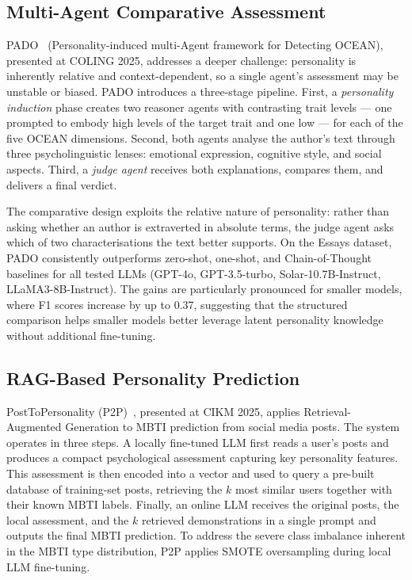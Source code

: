 \documentclass[../main.tex]{subfiles}
\begin{document}
\subsection{Multi-Agent Comparative Assessment}

PADO~\cite{yeo2025pado} (Personality-induced multi-Agent framework for Detecting OCEAN), presented at COLING 2025, addresses a deeper challenge: personality is inherently relative and context-dependent, so a single agent's assessment may be unstable or biased. PADO introduces a three-stage pipeline. First, a \emph{personality induction} phase creates two reasoner agents with contrasting trait levels --- one prompted to embody high levels of the target trait and one low --- for each of the five OCEAN dimensions. Second, both agents analyse the author's text through three psycholinguistic lenses: emotional expression, cognitive style, and social aspects. Third, a \emph{judge agent} receives both explanations, compares them, and delivers a final verdict.

The comparative design exploits the relative nature of personality: rather than asking whether an author is extraverted in absolute terms, the judge agent asks which of two characterisations the text better supports. On the Essays dataset, PADO consistently outperforms zero-shot, one-shot, and Chain-of-Thought baselines for all tested LLMs (GPT-4o, GPT-3.5-turbo, Solar-10.7B-Instruct, LLaMA3-8B-Instruct). The gains are particularly pronounced for smaller models, where F1 scores increase by up to 0.37, suggesting that the structured comparison helps smaller models better leverage latent personality knowledge without additional fine-tuning.

\subsection{RAG-Based Personality Prediction}

PostToPersonality (P2P)~\cite{ma2025post}, presented at CIKM 2025, applies Retrieval-Augmented Generation to MBTI prediction from social media posts. The system operates in three steps. A locally fine-tuned LLM first reads a user's posts and produces a compact psychological assessment capturing key personality features. This assessment is then encoded into a vector and used to query a pre-built database of training-set posts, retrieving the $k$ most similar users together with their known MBTI labels. Finally, an online LLM receives the original posts, the local assessment, and the $k$ retrieved demonstrations in a single prompt and outputs the final MBTI prediction. To address the severe class imbalance inherent in the MBTI type distribution, P2P applies SMOTE oversampling during local LLM fine-tuning.
\end{document}
